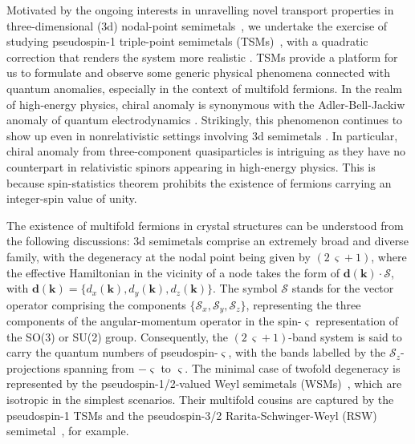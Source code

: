 \documentclass[aps,prb,onecolumn,nofootinbib,citeautoscript,10pt]{revtex4-2}
\begin{document}
Motivated by the ongoing interests in unravelling novel transport properties in three-dimensional (3d) nodal-point semimetals~\cite{burkov11_Weyl, armitage_review, yan17_topological, ips-kush-review, bernevig, grushin-multifold, ips-hermann-review, claudia-multifold}, we undertake the exercise of studying pseudospin-1 triple-point semimetals (TSMs)~\cite{bernevig, ips3by2, ady-spin1, krish-spin1, ips-cd1, tang2017_multiple, grushin-multifold, prb108035428, ips-abs-spin1, claudia-multifold, ips-spin1-ph}, with a quadratic correction that renders the system more realistic \cite{ni2021_giant, claudia-multifold}. TSMs provide a platform for us to formulate and observe some generic physical phenomena connected with quantum anomalies, especially in the context of multifold fermions. In the realm of high-energy physics, chiral anomaly is synonymous with the Adler-Bell-Jackiw anomaly of quantum electrodynamics \cite{adler, bell}. Strikingly, this phenomenon continues to show up even in nonrelativistic settings involving 3d semimetals \cite{chiral_ABJ, hosur-review, son13_chiral}. In particular, chiral anomaly from three-component quasiparticles is intriguing as they have no counterpart in relativistic spinors appearing in high-energy physics. This is because spin-statistics theorem prohibits the existence of fermions carrying an integer-spin value of unity.



The existence of multifold fermions in crystal structures can be understood from the following discussions: 3d semimetals comprise an extremely broad and diverse family, with the degeneracy at the nodal point being given by $(2\, \varsigma + 1)$, where the effective Hamiltonian in the vicinity of a node takes the form of $ \boldsymbol d( \boldsymbol{k} ) \cdot \boldsymbol {\mathcal S } $, with
$\boldsymbol d( \boldsymbol{k} ) = 
\lbrace d_x ( \boldsymbol{k} ) , d_y ( \boldsymbol{k} ) , d_z ( \boldsymbol{k} )  
 \rbrace.$
The symbol $\boldsymbol {\mathcal S } $ stands for the vector operator comprising the components $ \lbrace \mathcal S_x, \mathcal S_y, \mathcal S_z  \rbrace $, representing the three components of the angular-momentum operator in the spin-$\varsigma$ representation of the SO(3) or SU(2) group. Consequently, the $(2\, \varsigma + 1)$-band system is said to carry the quantum numbers of pseudospin-$\varsigma$, with the bands labelled by the $\mathcal S_z$-projections spanning from $- \varsigma $ to $ \varsigma $. The minimal case of twofold degeneracy is represented by the pseudospin-1/2-valued Weyl semimetals (WSMs)~\cite{burkov11_Weyl, armitage_review, yan17_topological}, which are isotropic in the simplest scenarios. Their multifold cousins are captured by the pseudospin-1 TSMs and the pseudospin-3/2 Rarita-Schwinger-Weyl (RSW) semimetal~\cite{bernevig, long, igor, igor2, isobe-fu, tang2017_multiple, ips3by2, ips-cd1, ma2021_observation, ips-magnus, ips-jns, prb108035428, ips_jj_rsw, grushin-multifold, claudia-multifold, ips-rsw-ph, ips-shreya}, for example. 
\end{document}
